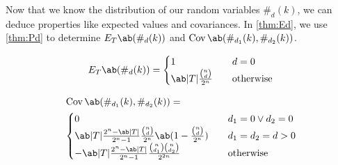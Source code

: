 Now that we know the distribution of our random variables $\#_d (k)$, we can deduce properties like expected values and covariances. In \cref{thm:Ed}, we use \cref{thm:Pd} to determine $E_T \ab(\#_d (k))$ and $\Cov\ab(\#_{d_1} (k), \#_{d_2} (k))$.

\begin{lemma}
\label{thm:Ed}
\begin{equation}
    \label{eq:Ed}
    E_T\ab(\#_d (k)) = \begin{cases}
        1 &\quad d = 0 \\
        \ab|T| \frac{\binom{n}{d}}{2^n} &\quad \text{otherwise}
    \end{cases}
\end{equation}

\begin{equation}
    \label{eq:Covd1d2}
    \begin{aligned}
    &\Cov\ab(\#_{d_1} (k), \#_{d_2} (k)) = \\ 
    &\begin{cases}
        0 &\quad d_1 = 0 \vee d_2 = 0 \\
        \ab|T| \frac{2^n - \ab|T|}{2^n - 1} \frac{\binom{n}{d}}{2^n} \ab(1 - \frac{\binom{n}{d}}{2^n}) &\quad d_1 = d_2 = d > 0\\
        -\ab|T| \frac{2^n - \ab|T|}{2^n - 1} \frac{\binom{n}{d_1} \binom{n}{d_2}}{2^{2n}} &\quad \text{otherwise}
    \end{cases}
    \end{aligned}
\end{equation}
\end{lemma}

